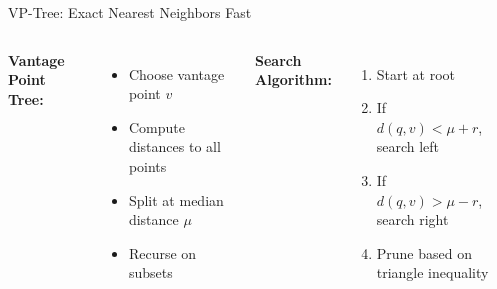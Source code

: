 \begin{frame}{VP-Tree: Exact Nearest Neighbors Fast}
\begin{columns}
\textbf{Vantage Point Tree:}
\begin{itemize}
\item Choose vantage point $v$
\item Compute distances to all points
\item Split at median distance $\mu$
\item Recurse on subsets
\end{itemize}

\textbf{Search Algorithm:}
\begin{enumerate}
\item Start at root
\item If $d(q,v) < \mu + r$, search left
\item If $d(q,v) > \mu - r$, search right
\item Prune based on triangle inequality
\end{enumerate}

\begin{center}
\end{center}
\end{columns}
\end{frame}



